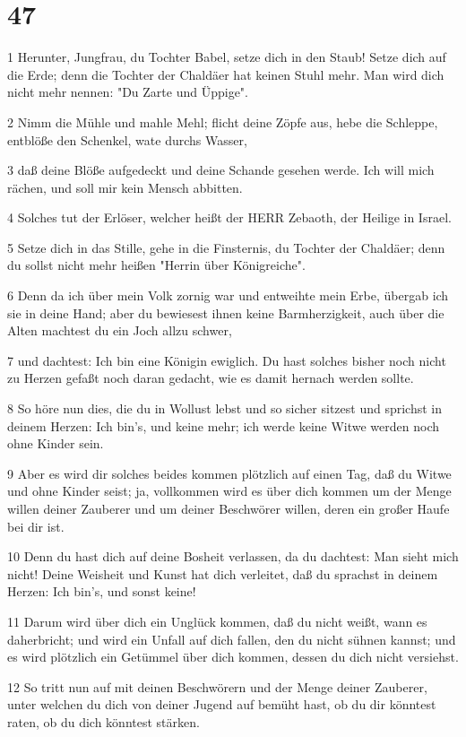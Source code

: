 \chapter{47}

\par 1 Herunter, Jungfrau, du Tochter Babel, setze dich in den Staub! Setze dich auf die Erde; denn die Tochter der Chaldäer hat keinen Stuhl mehr. Man wird dich nicht mehr nennen: "Du Zarte und Üppige".
\par 2 Nimm die Mühle und mahle Mehl; flicht deine Zöpfe aus, hebe die Schleppe, entblöße den Schenkel, wate durchs Wasser,
\par 3 daß deine Blöße aufgedeckt und deine Schande gesehen werde. Ich will mich rächen, und soll mir kein Mensch abbitten.
\par 4 Solches tut der Erlöser, welcher heißt der HERR Zebaoth, der Heilige in Israel.
\par 5 Setze dich in das Stille, gehe in die Finsternis, du Tochter der Chaldäer; denn du sollst nicht mehr heißen "Herrin über Königreiche".
\par 6 Denn da ich über mein Volk zornig war und entweihte mein Erbe, übergab ich sie in deine Hand; aber du bewiesest ihnen keine Barmherzigkeit, auch über die Alten machtest du ein Joch allzu schwer,
\par 7 und dachtest: Ich bin eine Königin ewiglich. Du hast solches bisher noch nicht zu Herzen gefaßt noch daran gedacht, wie es damit hernach werden sollte.
\par 8 So höre nun dies, die du in Wollust lebst und so sicher sitzest und sprichst in deinem Herzen: Ich bin's, und keine mehr; ich werde keine Witwe werden noch ohne Kinder sein.
\par 9 Aber es wird dir solches beides kommen plötzlich auf einen Tag, daß du Witwe und ohne Kinder seist; ja, vollkommen wird es über dich kommen um der Menge willen deiner Zauberer und um deiner Beschwörer willen, deren ein großer Haufe bei dir ist.
\par 10 Denn du hast dich auf deine Bosheit verlassen, da du dachtest: Man sieht mich nicht! Deine Weisheit und Kunst hat dich verleitet, daß du sprachst in deinem Herzen: Ich bin's, und sonst keine!
\par 11 Darum wird über dich ein Unglück kommen, daß du nicht weißt, wann es daherbricht; und wird ein Unfall auf dich fallen, den du nicht sühnen kannst; und es wird plötzlich ein Getümmel über dich kommen, dessen du dich nicht versiehst.
\par 12 So tritt nun auf mit deinen Beschwörern und der Menge deiner Zauberer, unter welchen du dich von deiner Jugend auf bemüht hast, ob du dir könntest raten, ob du dich könntest stärken.
